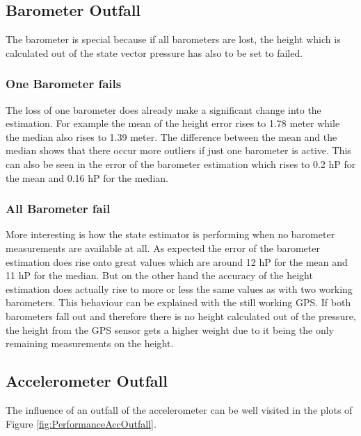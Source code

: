 \subsection{Barometer Outfall}
The barometer is special because if all barometers are lost,
the height which is calculated out of the state vector pressure has also to be set to failed.

\subsubsection{One Barometer fails}
The loss of one barometer does already make a significant change into the estimation.
For example the mean of the height error rises to 1.78 meter while the median also rises to 1.39 meter.
The difference between the mean and the median shows that there occur more outliers if just one barometer is active.
This can also be seen in the error of the barometer estimation which rises to 0.2 hP for the mean and 0.16 hP for the median.

\subsubsection{All Barometer fail}
More interesting is how the state estimator is performing when no barometer measurements are available at all.
As expected the error of the barometer estimation does rise onto great values which are around 12 hP for the mean and 11 hP for the median.
But on the other hand the accuracy of the height estimation does actually rise to more or less the same values as with two working barometers.
This behaviour can be explained with the still working GPS.
If both barometers fall out and therefore there is no height calculated out of the pressure, the height from the
GPS sensor gets a higher weight due to it being the only remaining measurements on the height.

\newpage
\subsection{Accelerometer Outfall}
The influence of an outfall of the accelerometer can be well visited in the plots of Figure \ref{fig:PerformanceAccOutfall}.

